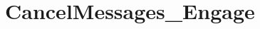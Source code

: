 \hypertarget{group___cancel_messages___engage}{
\section{CancelMessages\_\-Engage}
\label{group___cancel_messages___engage}
}
